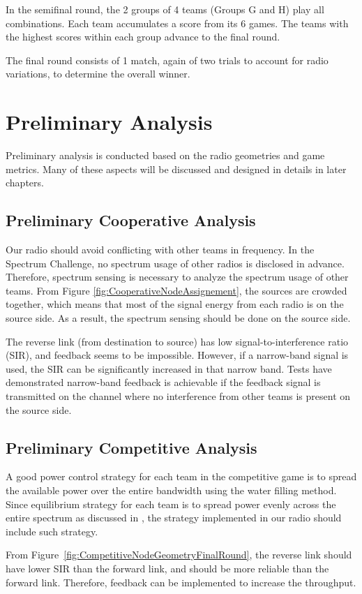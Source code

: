 In the semifinal round, the 2 groups of 4 teams (Groups G and H) play all combinations. Each team accumulates a score from its 6 games. The teams with the highest scores within each group advance to the final round.

The final round consists of 1 match, again of two trials to account for radio variations, to determine the overall winner.

\section{Preliminary Analysis}
Preliminary analysis is conducted based on the radio geometries and game metrics. Many of these aspects will be discussed and designed in details in later chapters.
\subsection{Preliminary Cooperative Analysis}
Our radio should avoid conflicting with other teams in frequency. In the Spectrum Challenge, no spectrum usage of other radios is disclosed in advance. Therefore, spectrum sensing is necessary to analyze the spectrum usage of other teams. From Figure \ref{fig:CooperativeNodeAssignement}, the sources are crowded together, which means that most of the signal energy from each radio is on the source side. As a result, the spectrum sensing should be done on the source side.

The reverse link (from destination to source) has low signal-to-interference ratio (SIR), and feedback seems to be impossible. However, if a narrow-band signal is used, the SIR can be significantly increased in that narrow band. Tests have demonstrated narrow-band feedback is achievable if the feedback signal is transmitted on the channel where no interference from other teams is present on the source side.

\subsection{Preliminary Competitive Analysis}
A good power control strategy for each team in the competitive game is to spread the available power over the entire bandwidth using the water filling method. Since equilibrium strategy for each team is to spread power evenly across the entire spectrum as discussed in \cite{REtkinandAParekhandDTse2007}, the strategy implemented in our radio should include such strategy.

From Figure~\ref{fig:CompetitiveNodeGeometryFinalRound}, the reverse link should have lower SIR than the forward link, and should be more reliable than the forward link. Therefore, feedback can be implemented to increase the throughput.

